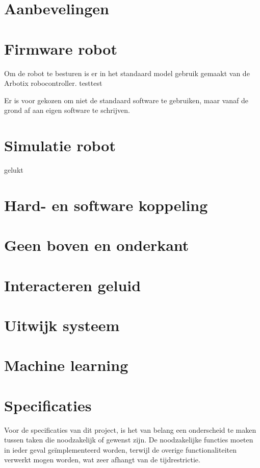 \documentclass[10pt,a4paper]{article}
\begin{document}
\section{Aanbevelingen}




\section{Firmware robot}
Om de robot te besturen is er in het standaard model gebruik gemaakt van de Arbotix robocontroller. 
testtest

Er is voor gekozen om niet de standaard software te gebruiken, maar vanaf de grond af aan eigen software te schrijven.

\section{Simulatie robot}
gelukt

\section{Hard- en software koppeling}


\section{Geen boven en onderkant}

\section{Interacteren geluid}

\section{Uitwijk systeem}

\section{Machine learning}

\section{Specificaties}

Voor de specificaties van dit project, is het van belang een onderscheid te maken tussen taken die noodzakelijk of gewenst zijn. De noodzakelijke functies moeten in ieder geval geïmplementeerd worden, terwijl de overige functionaliteiten verwerkt mogen worden, wat zeer afhangt van de tijdrestrictie.
\end{document}

